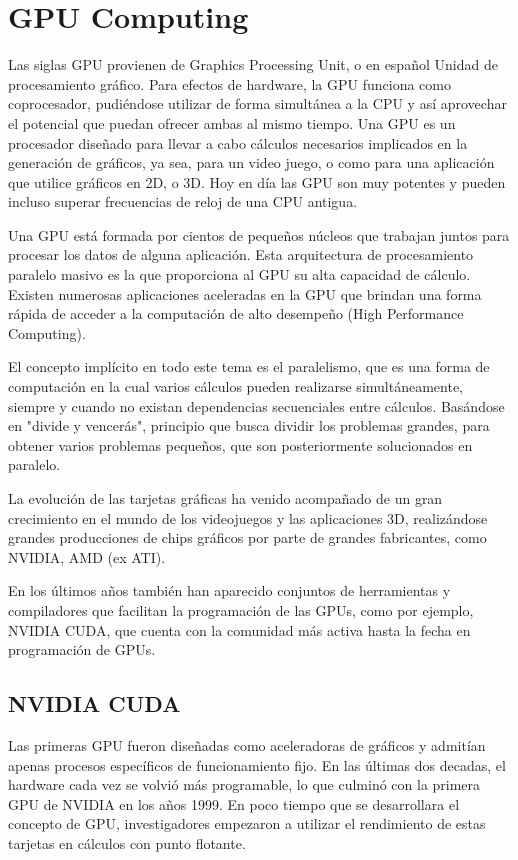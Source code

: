 \section{GPU Computing}
Las siglas GPU provienen de Graphics Processing Unit, o en español Unidad de procesamiento gráfico. Para efectos de hardware, la GPU funciona como coprocesador,
pudiéndose utilizar de forma simultánea a la CPU y así aprovechar el potencial que puedan ofrecer ambas al mismo tiempo. Una GPU es un procesador
diseñado para llevar a cabo cálculos necesarios implicados en la generación de gráficos, ya sea, para un video juego, o como para una aplicación que utilice
gráficos en 2D, o 3D. Hoy en día las GPU son muy potentes y pueden incluso superar frecuencias de reloj de una CPU antigua.

Una GPU está formada por cientos de pequeños núcleos que trabajan juntos para procesar los datos de alguna aplicación. Esta arquitectura de procesamiento paralelo
masivo es la que proporciona al GPU su alta capacidad de cálculo. Existen numerosas aplicaciones aceleradas en la GPU que brindan una forma rápida de acceder
a la computación de alto desempeño (High Performance Computing).

El concepto implícito en todo este tema es el paralelismo, que es una forma de computación en la cual varios cálculos pueden realizarse simultáneamente,
siempre y cuando no existan dependencias secuenciales entre cálculos. Basándose en "divide y vencerás", principio que busca dividir los problemas grandes, para
obtener varios problemas pequeños, que son posteriormente solucionados en paralelo.

La evolución de las tarjetas gráficas ha venido acompañado de un gran crecimiento en el mundo de los videojuegos y las aplicaciones 3D, realizándose grandes
producciones de chips gráficos por parte de grandes fabricantes, como NVIDIA, AMD (ex ATI).

En los últimos años también han aparecido conjuntos de herramientas y compiladores que facilitan la programación de las GPUs, como por ejemplo, NVIDIA CUDA, que
cuenta con la comunidad más activa hasta la fecha en programación de GPUs.

\subsection{NVIDIA CUDA}
Las primeras GPU fueron diseñadas como aceleradoras de gráficos y admitían apenas procesos específicos de funcionamiento fijo. En las últimas dos decadas, 
el hardware cada vez se volvió más programable, lo que culminó con la primera GPU de NVIDIA en los años 1999. En poco tiempo que se desarrollara el concepto de GPU,
investigadores empezaron a utilizar el rendimiento de estas tarjetas en cálculos con punto flotante.

